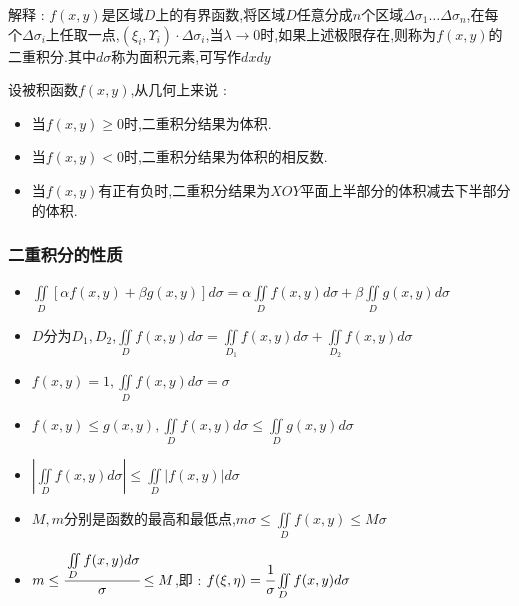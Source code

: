 \documentclass[UTF8,12pt]{ctexbook}
\newcommand{\defFunction}[1]{f(#1)}
\newcommand{\doubleIntegralOnZone}[1]{\iint\limits_{#1}}
\begin{document}
{{{{    解释 : $\defFunction{x,y}$是区域$D$上的有界函数,将区域$D$任意分成$n$个区域$\Delta\sigma_1\dots\Delta\sigma_n$,在每个$\Delta\sigma_i$上任取一点,$(\xi_i,\varUpsilon_i)\cdot\Delta\sigma_i$,当$\lambda \to 0$时,如果上述极限存在,则称为$f(x,y)$的二重积分.其中$d\sigma$称为面积元素,可写作$dxdy$

    设被积函数$\defFunction{x,y}$,从几何上来说 :
    \begin{itemize}
      \item 当$\defFunction{x,y} \geq 0$时,二重积分结果为体积.
      \item 当$\defFunction{x,y} < 0$时,二重积分结果为体积的相反数.
      \item 当$\defFunction{x,y}$有正有负时,二重积分结果为$XOY$平面上半部分的体积减去下半部分的体积.
    \end{itemize}
  }%

  \subsubsection{二重积分的性质}{
    \begin{itemize}
      \item $\doubleIntegralOnZone{D}\left[\alpha\defFunction{x,y} + \beta g(x,y)\right]d\sigma = \alpha\doubleIntegralOnZone{D}\defFunction{x,y}d\sigma + \beta\doubleIntegralOnZone{D}g(x,y)d\sigma$
      \item $D$分为$D_1,D_2$,$\doubleIntegralOnZone{D}\defFunction{x,y}d\sigma = \doubleIntegralOnZone{D_1}\defFunction{x,y}d\sigma + \doubleIntegralOnZone{D_2}\defFunction{x,y}d\sigma$
      \item $f(x,y) = 1,\doubleIntegralOnZone{D}f(x,y)d\sigma = \sigma$
      \item $\defFunction{x,y} \leq g(x,y), \doubleIntegralOnZone{D}\defFunction{x,y}d\sigma \leq \doubleIntegralOnZone{D}g(x,y)d\sigma$
      \item $\left|\doubleIntegralOnZone{D}\defFunction{x,y}d\sigma\right| \leq \doubleIntegralOnZone{D}\left|\defFunction{x,y}\right|d\sigma$
      \item $M,m$分别是函数的最高和最低点,$m\sigma \leq \doubleIntegralOnZone{D}\defFunction{x,y} \leq M\sigma$
      \item $m \leq \cfrac{\doubleIntegralOnZone{D}\defFunction{x,y}d\sigma}{\sigma} \leq M$,即 : $\defFunction{\xi,\eta} = \cfrac{1}{\sigma}\doubleIntegralOnZone{D}\defFunction{x,y}d\sigma$
    \end{itemize}
  }%

}}}
\end{document}
